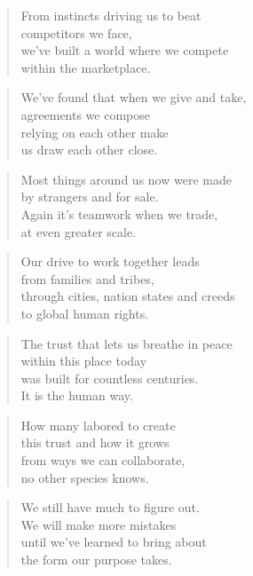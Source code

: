 \documentclass[10pt,a4paper]{article}
\begin{document}
\begin{multicols}{2}
\begin{verse}
From instincts driving us to beat\\
competitors we face,\\
we’ve built a world where we compete\\
within the marketplace.
\end{verse}

\begin{verse}
We’ve found that when we give and take,\\
agreements we compose\\
relying on each other make\\
us draw each other close.
\end{verse}

\begin{verse}
Most things around us now were made\\
by strangers and for sale.\\
Again it’s teamwork when we trade,\\
at even greater scale.
\end{verse}

\begin{verse}
Our drive to work together leads\\
from families and tribes,\\
through cities, nation states and creeds\\
to global human rights.
\end{verse}

\begin{verse}
The trust that lets us breathe in peace\\
within this place today\\
was built for countless centuries.\\
It is the human way.
\end{verse}

\begin{verse}
How many labored to create\\
this trust and how it grows\\
from ways we can collaborate,\\
no other species knows.
\end{verse}

\begin{verse}
We still have much to figure out.\\
We will make more mistakes\\
until we’ve learned to bring about\\
the form our purpose takes.
\end{verse}


\end{multicols}
\end{document}
